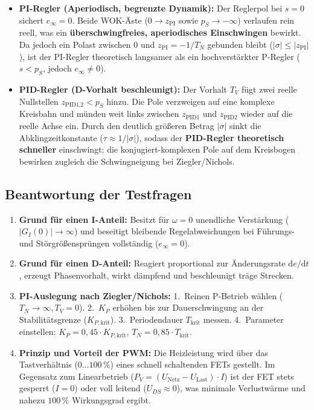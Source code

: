 \documentclass[a4paper,10pt,department=FakEI]{OTHRartcl}
\begin{document}
\begin{itemize}\setlength{\itemsep}{2pt}
    \item \textbf{PI-Regler (Aperiodisch, begrenzte Dynamik):} Der Reglerpol bei $s = 0$ sichert $e_{\infty} = 0$. Beide WOK-Äste ($0 \to z_{\text{PI}}$ sowie $p_S \to -\infty$) verlaufen rein reell, was ein \textbf{überschwingfreies, aperiodisches Einschwingen} bewirkt. Da jedoch ein Polast zwischen $0$ und $z_{\text{PI}} = -1/T_N$ gebunden bleibt ($|\sigma| \le |z_{\text{PI}}|$), ist der PI-Regler theoretisch langsamer als ein hochverstärkter P-Regler ($s < p_S$, jedoch $e_{\infty} \neq 0$).
    \item \textbf{PID-Regler (D-Vorhalt beschleunigt):} Der Vorhalt $T_V$ fügt zwei reelle Nullstellen $z_{\text{PID1,2}} < p_S$ hinzu. Die Pole verzweigen auf eine komplexe Kreisbahn und münden weit links zwischen $z_{\text{PID1}}$ und $z_{\text{PID2}}$ wieder auf die reelle Achse ein. Durch den deutlich größeren Betrag $|\sigma|$ sinkt die Abklingzeitkonstante ($\tau \approx 1/|\sigma|$), sodass der \textbf{PID-Regler theoretisch schneller} einschwingt; die konjugiert-komplexen Pole auf dem Kreisbogen bewirken zugleich die Schwingneigung bei Ziegler/Nichols.
\end{itemize}

\subsection{Beantwortung der Testfragen}
\begin{enumerate}\setlength{\itemsep}{2pt}
    \item \textbf{Grund für einen I-Anteil:} Besitzt für $\omega = 0$ unendliche Verstärkung ($|G_I(0)| \to \infty$) und beseitigt bleibende Regelabweichungen bei Führungs- und Störgrößensprüngen vollständig ($e_{\infty} = 0$).
    \item \textbf{Grund für einen D-Anteil:} Reagiert proportional zur Änderungsrate $\mathrm{d}e/\mathrm{d}t$, erzeugt Phasenvorhalt, wirkt dämpfend und beschleunigt träge Strecken.
    \item \textbf{PI-Auslegung nach Ziegler/Nichols:} 1.~Reinen P-Betrieb wählen ($T_N \to \infty, T_V = 0$). 2.~$K_P$ erhöhen bis zur Dauerschwingung an der Stabilitätsgrenze ($K_{P,\text{krit}}$). 3.~Periodendauer $T_{\text{krit}}$ messen. 4.~Parameter einstellen: $K_P = 0{,}45 \cdot K_{P,\text{krit}}$, $T_N = 0{,}85 \cdot T_{\text{krit}}$.
    \item \textbf{Prinzip und Vorteil der PWM:} Die Heizleistung wird über das Tastverhältnis ($0\dots 100\,\%$) eines schnell schaltenden FETs gestellt. Im Gegensatz zum Linearbetrieb ($P_V = (U_{\text{Netz}} - U_{\text{Last}}) \cdot I$) ist der FET stets gesperrt ($I = 0$) oder voll leitend ($U_{DS} \approx 0$), was minimale Verlustwärme und nahezu $100\,\%$ Wirkungsgrad ergibt.
\end{enumerate}
\end{document}
